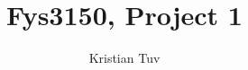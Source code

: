 \documentclass[a4paper, norsk, 12pt]{article}
\begin{document}
\author{Kristian Tuv}
\title{Fys3150, Project 1}
\maketitle
\end{document}

